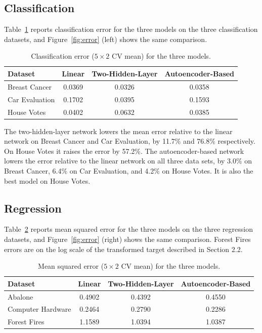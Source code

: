 \documentclass[twoside,11pt]{article}
\begin{document}
\subsection{Classification}
Table~\ref{tab:classification-results} reports classification error for the three models on the three classification datasets, and Figure~\ref{fig:error} (left) shows the same comparison.

\begin{table}[h]
    \centering
    \begin{tabular}{lccc}
    \hline
    Dataset & Linear & Two-Hidden-Layer & Autoencoder-Based \\
    \hline
    Breast Cancer   & 0.0369 & 0.0326 & 0.0358 \\
    Car Evaluation  & 0.1702 & 0.0395 & 0.1593 \\
    House Votes     & 0.0402 & 0.0632 & 0.0385 \\
    \hline
    \end{tabular}
    \caption{Classification error ($5 \times 2$ CV mean) for the three models.}
    \label{tab:classification-results}
\end{table}

The two-hidden-layer network lowers the mean error relative to the linear network on Breast Cancer and Car Evaluation, by 11.7\% and 76.8\% respectively. On House Votes it raises the error by 57.2\%. The autoencoder-based network lowers the error relative to the linear network on all three data sets, by 3.0\% on Breast Cancer, 6.4\% on Car Evaluation, and 4.2\% on House Votes. It is also the best model on House Votes.

\subsection{Regression}
Table~\ref{tab:regression-results} reports mean squared error for the three models on the three regression datasets, and Figure~\ref{fig:error} (right) shows the same comparison. Forest Fires errors are on the log scale of the transformed target described in Section 2.2.

\begin{table}[h]
\centering
\begin{tabular}{lccc}
\hline
Dataset & Linear & Two-Hidden-Layer & Autoencoder-Based \\
\hline
Abalone            & 0.4902      & 0.4392      & 0.4550 \\
Computer Hardware  & 0.2464      & 0.2790      & 0.2286 \\
Forest Fires       & 1.1589      & 1.0394      & 1.0387 \\
\hline
\end{tabular}
\caption{Mean squared error ($5 \times 2$ CV mean) for the three models.}
\label{tab:regression-results}
\end{table}
\end{document}
